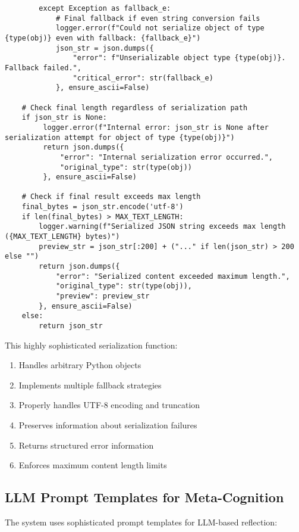 \documentclass[12pt,a4paper]{article}
\begin{document}
\begin{pageablecode}
\begin{verbatim}
        except Exception as fallback_e:
            # Final fallback if even string conversion fails
            logger.error(f"Could not serialize object of type {type(obj)} even with fallback: {fallback_e}")
            json_str = json.dumps({
                "error": f"Unserializable object type {type(obj)}. Fallback failed.",
                "critical_error": str(fallback_e)
            }, ensure_ascii=False)

    # Check final length regardless of serialization path
    if json_str is None:
         logger.error(f"Internal error: json_str is None after serialization attempt for object of type {type(obj)}")
         return json.dumps({
             "error": "Internal serialization error occurred.",
             "original_type": str(type(obj))
         }, ensure_ascii=False)

    # Check if final result exceeds max length
    final_bytes = json_str.encode('utf-8')
    if len(final_bytes) > MAX_TEXT_LENGTH:
        logger.warning(f"Serialized JSON string exceeds max length ({MAX_TEXT_LENGTH} bytes)")
        preview_str = json_str[:200] + ("..." if len(json_str) > 200 else "")
        return json.dumps({
            "error": "Serialized content exceeded maximum length.",
            "original_type": str(type(obj)),
            "preview": preview_str
        }, ensure_ascii=False)
    else:
        return json_str
\end{verbatim}
\end{pageablecode}
This highly sophisticated serialization function:
\begin{enumerate}[label=\arabic*.]
    \item Handles arbitrary Python objects
    \item Implements multiple fallback strategies
    \item Properly handles UTF-8 encoding and truncation
    \item Preserves information about serialization failures
    \item Returns structured error information
    \item Enforces maximum content length limits
\end{enumerate}

\subsection*{LLM Prompt Templates for Meta-Cognition}

The system uses sophisticated prompt templates for LLM-based reflection:
\end{document}
